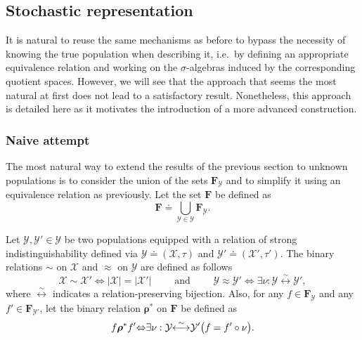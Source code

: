 \documentclass{aptpub}
\numberwithin{equation}{section}
\begin{document}
\subsection{Stochastic representation}
\label{ssec:stochasticRepresentation}

It is natural to reuse the same mechanisms as before to bypass the necessity of knowing the true population when describing it, i.e.\ by defining an appropriate equivalence relation and working on the $\sigma$-algebras induced by the corresponding quotient spaces. However, we will see that the approach that seems the most natural at first does not lead to a satisfactory result. Nonetheless, this approach is detailed here as it motivates the introduction of a more advanced construction.

\subsubsection{Naive attempt}

The most natural way to extend the results of the previous section to unknown populations is to consider the union of the sets ${\mathbf{F}}_{\mathcal{Y}}$ and to simplify it using an equivalence relation as previously. Let the set ${\mathbf{F}}$ be defined as
{\begin{equation*}{
{\mathbf{F}} {\doteq} \bigcup_{{\mathcal{Y}} \in {\boldsymbol{\mathcal{Y}}} } {\mathbf{F}}_{\mathcal{Y}}.
}\end{equation*}}

\begin{definition}
\label{def:equivStrongDist}
Let ${\mathcal{Y}},{\mathcal{Y}}' \in {\boldsymbol{\mathcal{Y}}}$ be two populations equipped with a relation of strong indistinguishability defined via ${\mathcal{Y}} {\doteq} ({\mathcal{X}},\tau)$ and ${\mathcal{Y}}' {\doteq} ({\mathcal{X}}',\tau')$. The binary relations $\sim$ on ${\boldsymbol{\mathcal{X}}}$ and ${\approx}$ on ${\boldsymbol{\mathcal{Y}}}$ are defined as follows
{\begin{equation*}{
{\mathcal{X}} \sim {\mathcal{X}}' {\Leftrightarrow} |{\mathcal{X}}| = |{\mathcal{X}}'| {\qquad\mbox{ and }\qquad} {\mathcal{Y}} {\approx} {\mathcal{Y}}' {\Leftrightarrow} \exists \nu : {\mathcal{Y}} {\stackrel{\sim}{{\longleftrightarrow}}} {\mathcal{Y}}',
}\end{equation*}}
where ${\stackrel{\sim}{{\longleftrightarrow}}}$ indicates a relation-preserving bijection. Also, for any $f \in {\mathbf{F}}_{\mathcal{Y}}$ and any $f' \in {\mathbf{F}}_{{\mathcal{Y}}'}$, let the binary relation ${\boldsymbol{\rho}}^*$ on ${\mathbf{F}}$ be defined as
{\begin{equation}\label{{def:equivStrongDist:eq:rhoBar}}{
f {\boldsymbol{\rho}}^* f' {\Leftrightarrow} \exists \nu : {\mathcal{Y}} {\stackrel{\sim}{{\longleftrightarrow}}} {\mathcal{Y}}' \big( f = f' \circ \nu \big).
}\end{equation}}
\end{definition}
\end{document}
